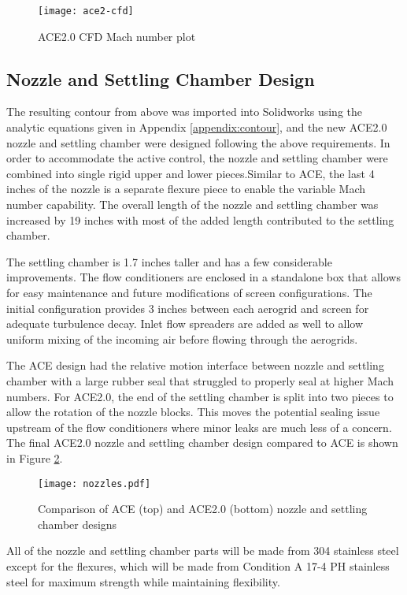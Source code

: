 \begin{figure}[ht]
    \centering
    \texttt{[image: ace2-cfd]}
    \caption{ACE2.0 CFD Mach number plot}
    \label{fig:ace2-cfd}
\end{figure}

\subsection{Nozzle and Settling Chamber Design}

The resulting contour from above was imported into Solidworks using the analytic equations given in Appendix \ref{appendix:contour}, and the new ACE2.0 nozzle and settling chamber were designed following the above requirements. In order to accommodate the active control, the nozzle and settling chamber were combined into single rigid upper and lower pieces.Similar to ACE, the last 4 inches of the nozzle is a separate flexure piece to enable the variable Mach number capability. The overall length of the nozzle and settling chamber was increased by 19 inches with most of the added length contributed to the settling chamber. 

The settling chamber is 1.7 inches taller and has a few considerable improvements. The flow conditioners are enclosed in a standalone box that allows for easy maintenance and future modifications of screen configurations. The initial configuration provides 3 inches between each aerogrid and screen for adequate turbulence decay. Inlet flow spreaders are added as well to allow uniform mixing of the incoming air before flowing through the aerogrids. 

The ACE design had the relative motion interface between nozzle and settling chamber with a large rubber seal that struggled to properly seal at higher Mach numbers. For ACE2.0, the end of the settling chamber is split into two pieces to allow the rotation of the nozzle blocks. This moves the potential sealing issue upstream of the flow conditioners where minor leaks are much less of a concern. The final ACE2.0 nozzle and settling chamber design compared to ACE is shown in Figure \ref{fig:nozzles}. 

\begin{figure}[ht]
    \centering
    \texttt{[image: nozzles.pdf]}
    \caption{Comparison of ACE (top) and ACE2.0 (bottom) nozzle and settling chamber designs}
    \label{fig:nozzles}
\end{figure}

All of the nozzle and settling chamber parts will be made from 304 stainless steel except for the flexures, which will be made from Condition A 17-4 PH stainless steel for maximum strength while maintaining flexibility.

